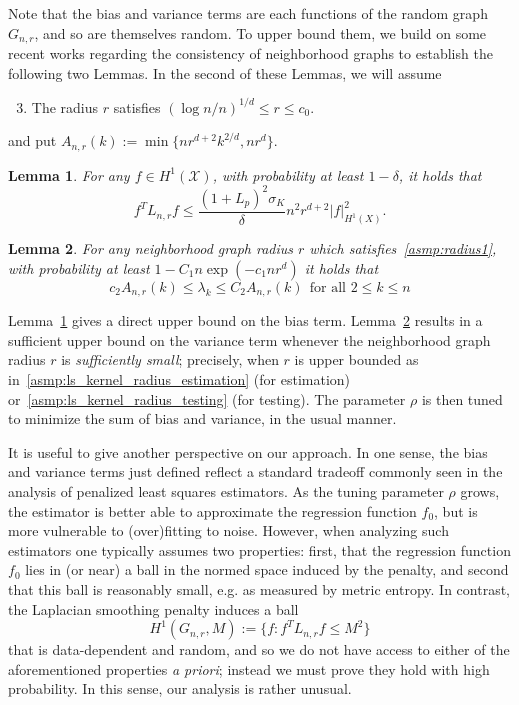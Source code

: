 \documentclass[twoside]{article}
\newcommand{\1}{\mathbf{1}}
\newcommand{\Lap}{L}
\newcommand{\Xset}{\mathcal{X}}
\newtheorem{lemma}{Lemma}
\theoremstyle{definition}
\theoremstyle{remark}
\begin{document}
Note that the bias and variance terms are each functions of the random graph $G_{n,r}$, and so are themselves random. To upper bound them, we build on some recent works \citep{burago2014,trillos2019,calder2019} regarding the consistency of neighborhood graphs to establish the following two Lemmas. In the second of these Lemmas, we will assume
\begin{enumerate}[label=(R\arabic*)]
	\setcounter{enumi}{2}
	\item
	\label{asmp:radius1}
	The radius $r$ satisfies $(\log n/n)^{1/d} \leq r \leq c_0$.
\end{enumerate}
and put $A_{n,r}(k) := \min\{nr^{d + 2}k^{2/d},nr^d\}$.

\begin{lemma}
	\label{lem:graph_sobolev_seminorm}
	For any $f \in H^1(\Xset)$, with probability at least $1 - \delta$, it holds that
	\begin{equation}
	\label{eqn:graph_sobolev_seminorm}
	f^T \Lap_{n,r} f \leq \frac{(1 + L_p)^2 \sigma_K}{\delta} n^2 r^{d + 2} |f|_{H^1(X)}^2.
	\end{equation}
\end{lemma}
\begin{lemma}
	\label{lem:neighborhood_eigenvalue}
	For any neighborhood graph radius $r$ which satisfies~\ref{asmp:radius1}, with probability at least $1 - C_1n\exp(-c_1nr^d)$ it holds that
	\begin{equation}
	\label{eqn:neighborhood_eigenvalue}
	c_2A_{n,r}(k) \leq \lambda_k \leq C_2A_{n,r}(k)~~\textrm{for all $2 \leq k \leq n$}
	\end{equation}
\end{lemma}
Lemma~\ref{lem:graph_sobolev_seminorm} gives a direct upper bound on the bias term. Lemma~\ref{lem:neighborhood_eigenvalue} results in a sufficient upper bound on the variance term whenever the neighborhood graph radius $r$ is \textit{sufficiently small}; precisely, when $r$ is upper bounded as in~\ref{asmp:ls_kernel_radius_estimation} (for estimation) or~\ref{asmp:ls_kernel_radius_testing} (for testing). The parameter $\rho$ is then tuned to minimize the sum of bias and variance, in the usual manner.

It is useful to give another perspective on our approach. In one sense, the bias and variance terms just defined reflect a standard tradeoff commonly seen in the analysis of penalized least squares estimators. As the tuning parameter $\rho$ grows, the estimator is better able to approximate the regression function $f_0$, but is more vulnerable to (over)fitting to noise. However, when analyzing such estimators one typically assumes two properties: first, that the regression function $f_0$ lies in (or near) a ball in the normed space induced by the penalty, and second that this ball is reasonably small, e.g. as measured by metric entropy. In contrast, the Laplacian smoothing penalty induces a ball
\begin{equation*}
H^1(G_{n,r},M) := \{f: f^T \Lap_{n,r} f \leq M^2\}
\end{equation*}
that is data-dependent and random, and so we do not have access to either of the aforementioned properties \emph{a priori}; instead we must prove they hold with high probability. In this sense, our analysis is rather unusual.
\end{document}
